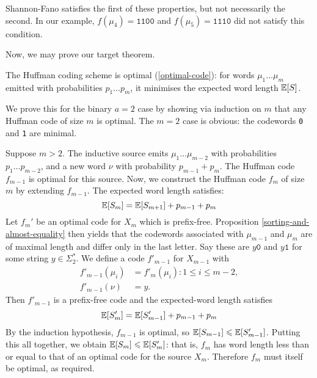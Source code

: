 \documentclass{article}
\begin{document}
\begin{note}
	Shannon-Fano satisfies the first of these properties,
	but not necessarily the second.
	In our example,
	$f(\mu_4) = \texttt{1100}$ and
	$f(\mu_5) = \texttt{1110}$
	did not satisfy this condition.
\end{note}

Now, we may prove our target theorem.

\begin{theorem}
    The Huffman coding scheme is optimal (\ref{optimal-code}):
    for words $\mu_1 \dots \mu_m$
    emitted with probabilities $p_1 \dots p_m$,
    it minimises the expected word length $\mathbb{E}[S]$.
\end{theorem}

\begin{prf}
	We prove this for the binary $a=2$ case
	by showing via induction on $m$ that any Huffman code of size $m$ is optimal.
	The $m=2$ case is obvious:
	the codewords \texttt{0} and \texttt{1} are minimal.
	
	Suppose $m > 2$.
	The inductive source emits $\mu_1 \dots \mu_{m-2}$
	with probabilities $p_1 \dots p_{m-2}$,
	and a new word $\nu$ with probability $p_{m-1} + p_m$.
	The Huffman code $f_{m-1}$ is optimal for this source.
	Now, we construct the Huffman code $f_m$ of size $m$
	by extending $f_{m-1}$.
	The expected word length satisfies:
	\[
	\mathbb{E}[S_m] = \mathbb{E}[S_{m+1}] + p_{m-1} + p_m
	\]
	Let $f_m'$ be an optimal code for $X_m$ which is prefix-free.
	Proposition \ref{sorting-and-almost-equality} then yields that
	the codewords associated with $\mu_{m-1}$ and $\mu_m$ are of maximal length
	and differ only in the last letter. 
	Say these are $y\texttt{0}$ and $y\texttt{1}$
	for some string $y \in \Sigma_2^*$.
	We define a code $f'_{m-1}$ for $X_{m-1}$ with
	\begin{align*}
    	f'_{m-1}(\mu_i) &= f'_{m}(\mu_i) : 1 \leq i \leq m-2, \\
    	f'_{m-1}(\nu) &= y.
	\end{align*}
	Then $f'_{m-1}$ is a prefix-free code
	and the expected-word length satisfies
	\[
	\mathbb{E}[S_{m}'] = \mathbb{E}[S'_{m-1}] + p_{m-1} + p_m
	\]
	By the induction hypothesis, $f_{m-1}$ is optimal,
	so $\mathbb{E}[S_{m-1}] \leqslant \mathbb{E}[S'_{m-1}]$.
	Putting this all together, we obtain $\mathbb{E}[S_m] \leqslant \mathbb{E}[S'_m]$:
	that is, $f_m$ has word length less than or equal to
	that of an optimal code for the source $X_m$.
	Therefore $f_m$ must itself be optimal, as required.
\end{prf}
\end{document}
